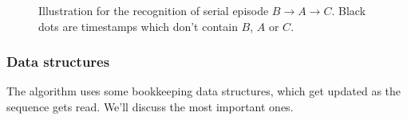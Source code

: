 \begin{figure}

\caption{Illustration for the recognition of serial episode $ B \to A \to C $. Black dots are timestamps which don't contain $ B $, $ A $ or $ C$.}
\label{fig:serial-recognition}
\end{figure}

\subsubsection{Data structures}

The algorithm uses some bookkeeping data structures, which get updated as the sequence gets read. We'll discuss the most important ones.
